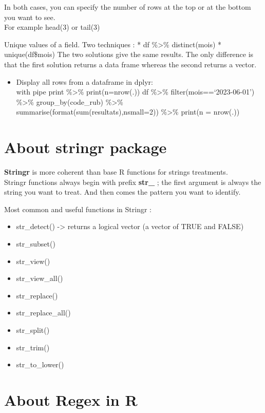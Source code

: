 \documentclass[
]{book}
\providecommand{\tightlist}{%
  \setlength{\itemsep}{0pt}\setlength{\parskip}{0pt}}
\begin{document}
In both cases, you can specify the number of rows at the top or at the bottom you want to see.\\
For example head(3) or tail(3)

Unique values of a field. Two techniques :
* df \%\textgreater\% distinct(mois)
* unique(df\$mois)
The two solutions give the same results. The only difference is that the first solution returns a data frame whereas the second returns a vector.

\begin{itemize}
\tightlist
\item
  Display all rows from a dataframe in dplyr:\\
  with pipe print \%\textgreater\% print(n=nrow(.))
  df \%\textgreater\% filter(mois==`2023-06-01') \%\textgreater\% group\_by(code\_rub) \%\textgreater\% summarise(format(sum(resultats),nsmall=2)) \%\textgreater\% print(n = nrow(.))
\end{itemize}

\hypertarget{about-stringr-package}{%
\section{About stringr package}\label{about-stringr-package}}

\textbf{Stringr} is more coherent than base R functions for strings treatments.\\
Stringr functions always begin with prefix \textbf{str\_} ; the first argument is always the string you want to treat. And then comes the pattern you want to identify.

Most common and useful functions in Stringr :

\begin{itemize}
\tightlist
\item
  str\_detect() -\textgreater{} returns a logical vector (a vector of TRUE and FALSE)
\item
  str\_subset()
\item
  str\_view()
\item
  str\_view\_all()
\item
  str\_replace()
\item
  str\_replace\_all()
\item
  str\_split()
\item
  str\_trim()
\item
  str\_to\_lower()
\end{itemize}

\hypertarget{about-regex-in-r}{%
\section{About Regex in R}\label{about-regex-in-r}}
\end{document}
